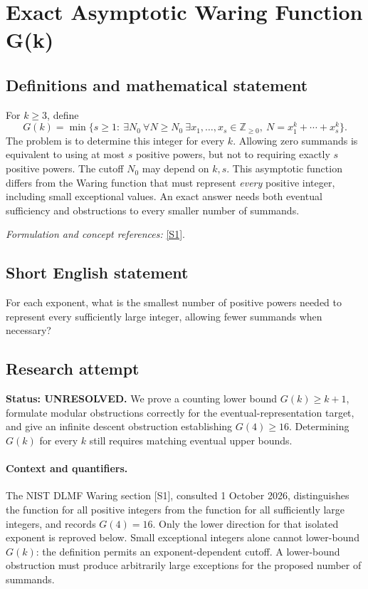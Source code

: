 \documentclass[11pt]{article}
\begin{document}
\section*{\texorpdfstring{Exact Asymptotic Waring Function G(k)}{Exact Asymptotic Waring Function G(k)}}\label{30006788}
\subsection{Definitions and mathematical statement}
For $k\ge3$, define
\[
 G(k)=\min\{s\ge1:\ \exists N_0\ \forall N\ge N_0\
 \exists x_1,\ldots,x_s\in{\mathbb{Z}}_{\ge0},\ N=x_1^k+\cdots+x_s^k\}.
\]
The problem is to determine this integer for every $k$. Allowing zero summands is equivalent to using at most $s$ positive powers, but not to requiring exactly $s$ positive powers. The cutoff $N_0$ may depend on $k,s$. This asymptotic function differs from the Waring function that must represent \emph{every} positive integer, including small exceptional values. An exact answer needs both eventual sufficiency and obstructions to every smaller number of summands.
\par\smallskip\textit{Formulation and concept references:} \href{https://dlmf.nist.gov/27.13}{[S1]}.

\subsection{Short English statement}
For each exponent, what is the smallest number of positive powers needed to represent every sufficiently large integer, allowing fewer summands when necessary?
\subsection{Research attempt}
\textbf{Status: UNRESOLVED.} We prove a counting lower bound $G(k)\ge k+1$, formulate modular obstructions correctly for the eventual-representation target, and give an infinite descent obstruction establishing $G(4)\ge16$. Determining $G(k)$ for every $k$ still requires matching eventual upper bounds.

\paragraph{Context and quantifiers.}
The NIST DLMF Waring section [S1], consulted 1 October 2026, distinguishes the function for all positive integers from the function for all sufficiently large integers, and records $G(4)=16$. Only the lower direction for that isolated exponent is reproved below. Small exceptional integers alone cannot lower-bound $G(k)$: the definition permits an exponent-dependent cutoff. A lower-bound obstruction must produce arbitrarily large exceptions for the proposed number of summands.
\end{document}
